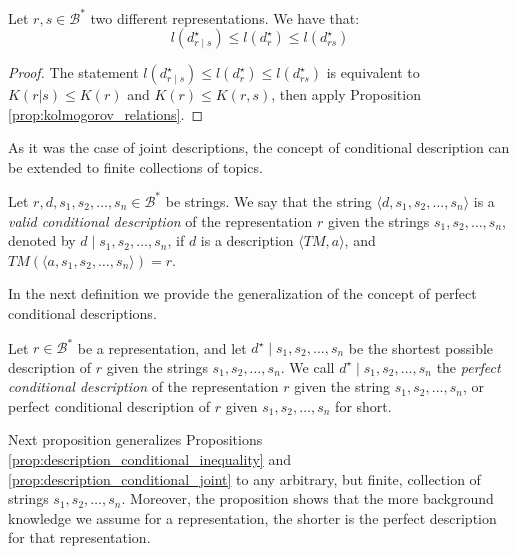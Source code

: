 \begin{proposition}
\label{prop:description_conditional_joint}
Let $r, s \in \mathcal{B}^\ast$ two different representations. We have that:
\[
l \left( d^\star_{r \mid s} \right) \leq l \left( d^\star_r \right) \leq l \left( d^\star_{rs} \right)
\]
\end{proposition}
\begin{proof}
The statement $l \left( d^\star_{r \mid s} \right) \leq l \left( d^\star_r \right) \leq l \left( d^\star_{rs} \right)$ is equivalent to $K(r | s ) \leq K(r)$ and $K(r) \leq K(r, s)$, then apply Proposition \ref{prop:kolmogorov_relations}.
\end{proof}

As it was the case of joint descriptions, the concept of conditional description can be extended to finite collections of topics.

\begin{definition}
Let $r, d, s_1, s_2, \ldots, s_n \in \mathcal{B}^\ast$ be strings. We say that the string $\langle d, s_1, s_2, \ldots, s_n \rangle$ is a \emph{valid conditional description} of the representation $r$ given the strings $s_1, s_2, \ldots, s_n$, denoted by $d \mid s_1, s_2, \ldots, s_n$, if $d$ is a description $\langle TM, a \rangle$, and $TM \left(\langle a, s_1, s_2, \ldots, s_n \rangle \right) = r$.
\end{definition}

In the next definition we provide the generalization of the concept of perfect conditional descriptions.

\begin{definition}
Let $r \in \mathcal{B}^\ast$ be a representation, and let $d^\star \mid s_1, s_2, \ldots, s_n$ be the shortest possible description of $r$ given the strings $s_1, s_2, \ldots, s_n$. We call $d^\star \mid s_1, s_2, \ldots, s_n$ the \emph{perfect conditional description} of the representation $r$ given the string $s_1, s_2, \ldots, s_n$, or perfect conditional description of $r$ given $s_1, s_2, \ldots, s_n$ for short.
\end{definition}

Next proposition generalizes Propositions \ref{prop:description_conditional_inequality} and \ref{prop:description_conditional_joint} to any arbitrary, but finite, collection of strings $s_1, s_2, \ldots, s_n$. Moreover, the proposition shows that the more background knowledge we assume for a representation, the shorter is the perfect description for that representation.

